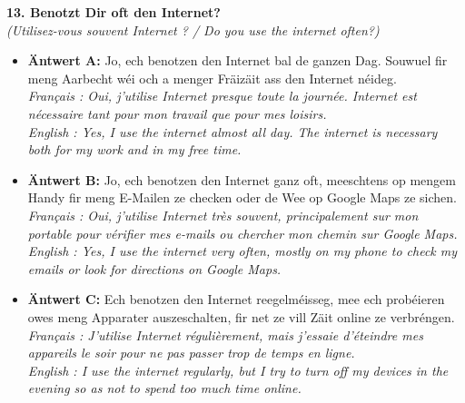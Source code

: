 \noindent\textbf{13. Benotzt Dir oft den Internet?}\\
\textit{(Utilisez-vous souvent Internet ? / Do you use the internet often?)}
\begin{itemize}
    \item \textbf{Äntwert A:} Jo, ech benotzen den Internet bal de ganzen Dag. Souwuel fir meng Aarbecht wéi och a menger Fräizäit ass den Internet néideg.\\
    \textit{Français : Oui, j'utilise Internet presque toute la journée. Internet est nécessaire tant pour mon travail que pour mes loisirs.}\\
    \textit{English : Yes, I use the internet almost all day. The internet is necessary both for my work and in my free time.}
    \item \textbf{Äntwert B:} Jo, ech benotzen den Internet ganz oft, meeschtens op mengem Handy fir meng E-Mailen ze checken oder de Wee op Google Maps ze sichen.\\
    \textit{Français : Oui, j'utilise Internet très souvent, principalement sur mon portable pour vérifier mes e-mails ou chercher mon chemin sur Google Maps.}\\
    \textit{English : Yes, I use the internet very often, mostly on my phone to check my emails or look for directions on Google Maps.}
    \item \textbf{Äntwert C:} Ech benotzen den Internet reegelméisseg, mee ech probéieren owes meng Apparater auszeschalten, fir net ze vill Zäit online ze verbréngen.\\
    \textit{Français : J'utilise Internet régulièrement, mais j'essaie d'éteindre mes appareils le soir pour ne pas passer trop de temps en ligne.}\\
    \textit{English : I use the internet regularly, but I try to turn off my devices in the evening so as not to spend too much time online.}
\end{itemize}
\vspace{0.5em}

